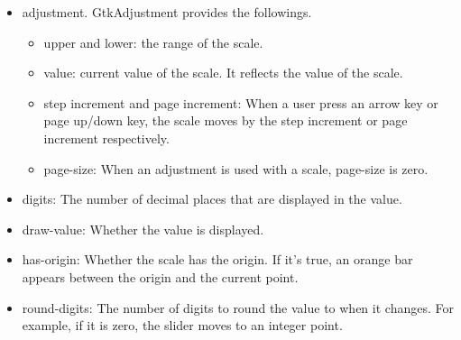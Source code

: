 \begin{itemize}
\tightlist
\item
  adjustment. GtkAdjustment provides the followings.

  \begin{itemize}
  \tightlist
  \item
    upper and lower: the range of the scale.
  \item
    value: current value of the scale. It reflects the value of the
    scale.
  \item
    step increment and page increment: When a user press an arrow key or
    page up/down key, the scale moves by the step increment or page
    increment respectively.
  \item
    page-size: When an adjustment is used with a scale, page-size is
    zero.
  \end{itemize}
\item
  digits: The number of decimal places that are displayed in the value.
\item
  draw-value: Whether the value is displayed.
\item
  has-origin: Whether the scale has the origin. If it's true, an orange
  bar appears between the origin and the current point.
\item
  round-digits: The number of digits to round the value to when it
  changes. For example, if it is zero, the slider moves to an integer
  point.
\end{itemize}

